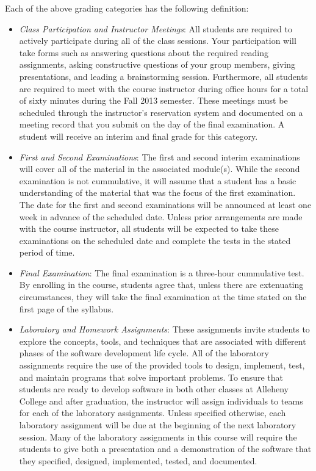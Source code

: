 Each of the above grading categories has the following definition:

\begin{itemize}

	\item {\em Class Participation and Instructor Meetings}: All students are required to actively participate during
		all of the class sessions. Your participation will take forms such as answering questions about the required
		reading assignments, asking constructive questions of your group members, giving presentations, and leading a
		brainstorming session. Furthermore, all students are required to meet with the course instructor during office
		hours for a total of sixty minutes during the Fall 2013 semester.  These meetings must be scheduled through the
		instructor's reservation system and documented on a meeting record that you submit on the day of the final
		examination. A student will receive an interim and final grade for this category.

	\item {\em First and Second Examinations}: The first and second interim examinations will cover all of the material
		in the associated module(s).  While the second examination is not cummulative, it will assume that a student has a
		basic understanding of the material that was the focus of the first examination.  The date for the first and
		second examinations will be announced at least one week in advance of the scheduled date.  Unless prior
		arrangements are made with the course instructor, all students will be expected to take these examinations on the
		scheduled date and complete the tests in the stated period of time.

	\item {\em Final Examination}: The final examination is a three-hour cummulative test.  By enrolling in the course,
		students agree that, unless there are extenuating circumstances, they will take the final examination at the
		time stated on the first page of the syllabus.

	\item {\em Laboratory and Homework Assignments}: These assignments invite students to explore the concepts, tools,
		and techniques that are associated with different phases of the software development life cycle.  All of the
		laboratory assignments require the use of the provided tools to design, implement, test, and maintain programs
		that solve important problems.  To ensure that students are ready to develop software in both other classes at
		Alleheny College and after graduation, the instructor will assign individuals to teams for each of the
		laboratory assignments.  Unless specified otherwise, each laboratory assignment will be due at the beginning of
		the next laboratory session.  Many of the laboratory assignments in this course will require the students to
		give both a presentation and a demonstration of the software that they specified, designed, implemented, tested,
		and documented.  
		

\end{itemize}
